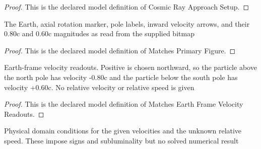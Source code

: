 \begin{proof}
  This is the declared model definition of Cosmic Ray Approach Setup.
\end{proof}
\begin{definition}
  \label{def:physics:phyx-mini-0591:phyxminiproblems-problemphyxmini0591-matchesprimaryfigure}
  The Earth, axial rotation marker, pole labels, inward velocity arrows, and their 0.80c and 0.60c magnitudes as read from the supplied bitmap
\end{definition}
\begin{proof}
  This is the declared model definition of Matches Primary Figure.
\end{proof}
\begin{definition}
  \label{def:physics:phyx-mini-0591:phyxminiproblems-problemphyxmini0591-matchesearthframevelocityreadouts}
  Earth-frame velocity readouts. Positive is chosen northward, so the particle above the north pole has velocity -0.80c and the particle below the south pole has velocity +0.60c. No relative velocity or relative speed is given
\end{definition}
\begin{proof}
  This is the declared model definition of Matches Earth Frame Velocity Readouts.
\end{proof}
\begin{definition}
  \label{def:physics:phyx-mini-0591:phyxminiproblems-problemphyxmini0591-hasphysicalcosmicrayparameters}
  Physical domain conditions for the given velocities and the unknown relative speed. These impose signs and subluminality but no solved numerical result
\end{definition}
